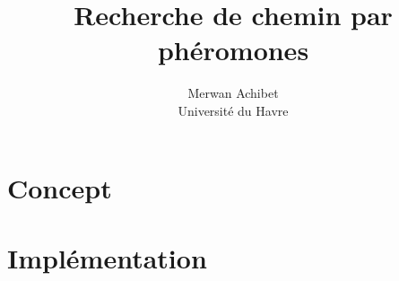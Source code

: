 \documentclass[12pt]{article}
\title{Recherche de chemin par phéromones}
\author{Merwan Achibet\\Université du Havre}
\date{}
\begin{document}
\maketitle

\section{Concept}

\cite{parunak}

\section{Implémentation}



\end{document}
